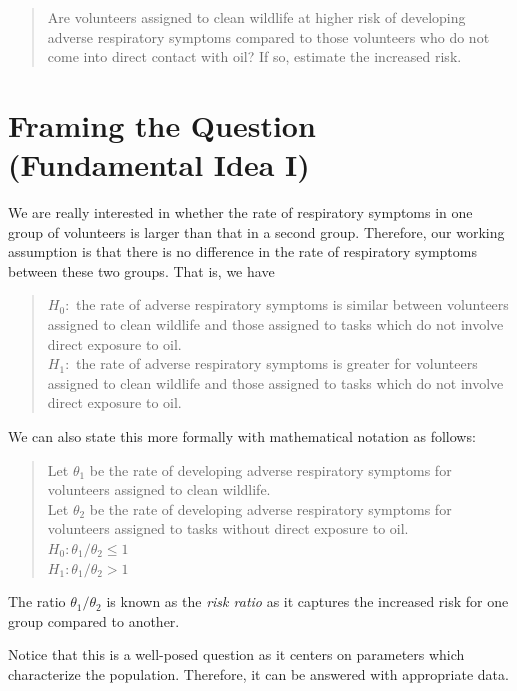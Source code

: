 \documentclass[]{book}
\theoremstyle{definition}
\theoremstyle{definition}
\theoremstyle{remark}
\begin{document}
\begin{quote}
Are volunteers assigned to clean wildlife at higher risk of developing
adverse respiratory symptoms compared to those volunteers who do not
come into direct contact with oil? If so, estimate the increased risk.
\end{quote}

\section{Framing the Question (Fundamental Idea
I)}\label{framing-the-question-fundamental-idea-i}

We are really interested in whether the rate of respiratory symptoms in
one group of volunteers is larger than that in a second group.
Therefore, our working assumption is that there is no difference in the
rate of respiratory symptoms between these two groups. That is, we have

\begin{quote}
\(H_0:\) the rate of adverse respiratory symptoms is similar between
volunteers assigned to clean wildlife and those assigned to tasks which
do not involve direct exposure to oil.\\
\(H_1:\) the rate of adverse respiratory symptoms is greater for
volunteers assigned to clean wildlife and those assigned to tasks which
do not involve direct exposure to oil.
\end{quote}

We can also state this more formally with mathematical notation as
follows:

\begin{quote}
Let \(\theta_1\) be the rate of developing adverse respiratory symptoms
for volunteers assigned to clean wildlife.\\
Let \(\theta_2\) be the rate of developing adverse respiratory symptoms
for volunteers assigned to tasks without direct exposure to oil.\\
\(H_0: \theta_1/\theta_2 \leq 1\)\\
\(H_1: \theta_1/\theta_2 > 1\)
\end{quote}

The ratio \(\theta_1/\theta_2\) is known as the \emph{risk ratio} as it
captures the increased risk for one group compared to another.

Notice that this is a well-posed question as it centers on parameters
which characterize the population. Therefore, it can be answered with
appropriate data.
\end{document}
